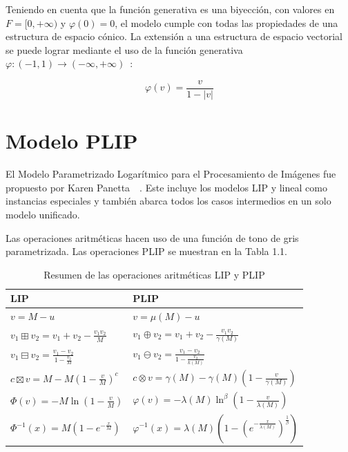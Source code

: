 Teniendo en cuenta que la función generativa es una biyección, con valores en $F = [ 0 , +\infty )$ y $\varphi(0)=0$, el modelo cumple con todas las propiedades de una estructura de espacio cónico. La extensión a una estructura de espacio vectorial se puede lograr mediante el uso de la función generativa $\varphi:(-1,1)\rightarrow (-\infty,+\infty)$~\cite{florea2009piecewise}:

\begin{equation}
	\varphi(v)=\frac{v}{1-|v|}
\end{equation}

\section{Modelo PLIP}

El Modelo Parametrizado Logar\'itmico para el Procesamiento de Im\'agenes fue propuesto por Karen Panetta~\cite{panetta2007parameterization}~\cite{panetta2010parameterized}. Este incluye los modelos LIP y lineal como instancias especiales y también abarca todos los casos intermedios en un solo modelo unificado.

Las operaciones aritméticas hacen uso de una función de tono de gris parametrizada. Las operaciones PLIP se muestran en la Tabla 1.1.

\begin{table}
	\caption{Resumen de las operaciones aritm\'eticas LIP y PLIP}
	\begin{center}
		\begin{tabular}{|l|l|}
			\hline 
			\textbf{LIP} & \textbf{PLIP}\\
			\hline
			$v=M-u$ & $v=\mu(M)-u$\\
			\hline
			$v_1\boxplus v_2=v_1+v_2-\frac{v_1v_2}{M}$ & $v_1\oplus v_2=v_1+v_2-\frac{v_1v_2}{\gamma(M)}$\\
			\hline
			$v_1\boxminus v_2=\frac{v_1-v_2}{1-\frac{v_2}{M}}$ & $v_1\ominus v_2=\frac{v_1-v_2}{1-\frac{v_2}{k(M)}}$\\
			\hline
			$c\boxtimes v=M-M(1-\frac{v}{M})^c$ & $c\otimes v=\gamma(M)-\gamma(M)(1-\frac{v}{\gamma(M)})$\\
			\hline
			$\varPhi(v)=-M\ln(1-\frac{v}{M})$ & $\varphi(v)=-\lambda(M)\ln^\beta(1-\frac{v}{\lambda(M)})$\\
			\hline
			$\varPhi^{-1}(x)=M\left(1-e^{-\frac{x}{M}}\right)$ & $\varphi^{-1}(x)=\lambda(M)\left(1-\left(e^{-\frac{x}{\lambda(M)}}\right)^{\frac{1}{\beta}}\right)$\\
			\hline
		\end{tabular}
	\end{center}
\end{table}

